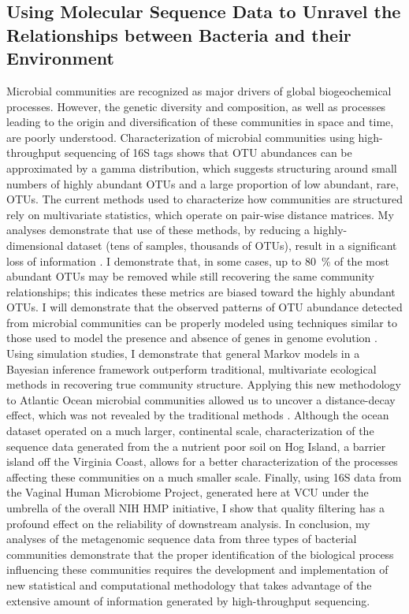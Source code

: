 
\subsection*{Using Molecular Sequence Data to Unravel the Relationships between Bacteria 
and their Environment}

Microbial communities are recognized as major drivers of global biogeochemical processes.  However, 
the genetic diversity and composition, as well as processes leading to the origin and diversification of these 
communities in space and time, are poorly understood.  Characterization of microbial communities using 
high-throughput sequencing of 16S tags shows that OTU abundances can be approximated by a gamma distribution, 
which suggests structuring around small numbers of highly abundant OTUs and a large proportion of low abundant, 
rare, OTUs.  The current methods used to characterize how communities are structured rely on multivariate statistics, 
which operate on pair-wise distance matrices.  My analyses demonstrate that use of these methods, by reducing a 
highly-dimensional dataset (tens of samples, thousands of OTUs), result in a significant loss of information 
\citep{Friedline:2012fm}. I demonstrate that, in some cases, up to \SI{80}{\percent} of the most abundant OTUs may be removed while 
still recovering the same community relationships; this indicates these metrics are biased toward the highly abundant OTUs.  I 
will demonstrate that the observed patterns of OTU abundance detected from microbial communities can be properly 
modeled using techniques similar to those used to model the presence and absence of genes in genome 
evolution \citep{Lake:2004cy, Rivera:2004ct}.  Using simulation studies, I demonstrate that general Markov models 
in a Bayesian inference framework outperform traditional, multivariate ecological methods in recovering true community 
structure.  Applying this new methodology to Atlantic Ocean microbial communities allowed us to uncover a distance-decay 
effect, which was not revealed by the traditional methods \citep{Friedline:2012fm}.  Although the ocean dataset operated on a 
much larger, continental scale, characterization of the sequence data generated from the a nutrient poor soil on Hog Island, 
a barrier island off the Virginia Coast, allows for a better characterization of the processes affecting these communities 
on a much smaller scale.  Finally, using 16S data from the Vaginal Human 
Microbiome Project, generated here at VCU under the umbrella of the overall NIH HMP initiative, I show that 
quality filtering has a profound effect on the reliability of downstream analysis.  In conclusion, 
my analyses of the metagenomic sequence data from three types of bacterial communities demonstrate that the proper 
identification of the biological process influencing these communities requires the development and implementation of 
new statistical and computational methodology that takes advantage of the extensive amount of information generated by 
high-throughput sequencing. 

